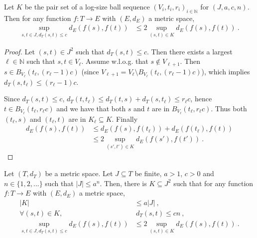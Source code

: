 \begin{lemma}\label{lem:sup_dist_le_two_mul_sup_dist_pairSet}
  \leanok
Let $K$ be the pair set of a log-size ball sequence $(V_i, t_i, r_i)_{i \in \mathbb{N}}$ for $(J, a, c, n)$.
Then for any function $f : T \to E$ with $(E,d_E)$ a metric space,
\begin{align*}
  \sup_{s,t\in J, d_T(s,t) \le c} d_E(f(s), f(t))
  & \le 2 \sup_{(s,t) \in K} d_E(f(s), f(t))
  \: .
\end{align*}
\end{lemma}

\begin{proof}
\leanok
Let $(s, t) \in J^2$ such that $d_T(s, t) \le c$.
Then there exists a largest $\ell \in \mathbb{N}$ such that $s, t \in V_\ell$.
Assume w.l.o.g. that $s \notin V_{\ell + 1}$. Then $s \in B_{V_\ell}(t_\ell, (r_\ell-1)c)$ (since $V_{\ell + 1} = V_\ell \setminus B_{V_\ell}(t_\ell, (r_\ell-1)c)$), which implies $d_T(s, t_\ell) \le (r_\ell - 1)c$.

Since $d_T(s, t) \le c$, $d_T(t, t_\ell) \le d_T(t, s) + d_T(s, t_\ell) \le r_\ell c$, hence $t \in B_{V_\ell}(t_\ell, r_\ell c)$ and we have that both $s$ and $t$ are in $B_{V_\ell}(t_\ell, r_\ell c)$.
Thus both $(t_\ell, s)$ and $(t_\ell, t)$ are in $K_\ell \subseteq K$.
Finally
\begin{align*}
  d_E(f(s), f(t))
  &\le d_E(f(s), f(t_\ell)) + d_E(f(t_\ell), f(t))
  \\
  &\le 2\sup_{(s',t') \in K} d_E(f(s'), f(t'))
  \: .
\end{align*}
\end{proof}


\begin{lemma}\label{lem:pair_reduction}
  \leanok
Let $(T,d_T)$ be a metric space.
Let $J \subseteq T$ be finite, $a > 1$, $c>0$ and $n \in \{1, 2, ...\}$ such that $|J| \le a^n$.
Then, there is $K \subseteq J^2$ such that for any function $f : T \to E$ with $(E,d_E)$ a metric space,
\begin{align}
  |K|
  & \le a |J|
  \:, \label{eq:chain1} \\
  \forall (s,t) \in K,
  &\:  d_T(s,t) \le c n
  \:, \label{eq:chain2} \\
  \sup_{s,t\in J, d_T(s,t) \le c} d_E(f(s), f(t))
  & \le 2 \sup_{(s,t) \in K} d_E(f(s), f(t))
  \: . \label{eq:chain3}
\end{align}
\end{lemma}

